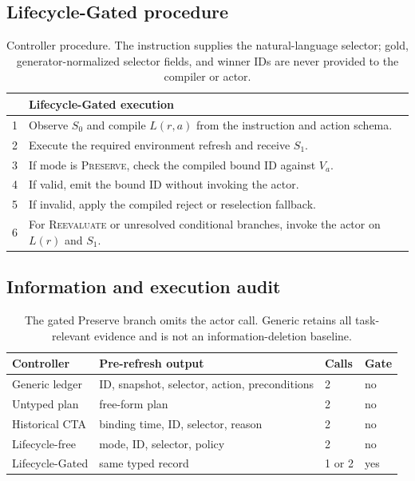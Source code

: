 \documentclass[10pt]{article}
\begin{document}
\subsection{Lifecycle-Gated procedure}
\begin{table}[H]
\centering
\small
\setlength{\tabcolsep}{4pt}
\begin{tabular}{rp{}}
\toprule
& Lifecycle-Gated execution \\
\midrule
1 & Observe $S_0$ and compile $L(r,a)$ from the instruction and action schema. \\
2 & Execute the required environment refresh and receive $S_1$. \\
3 & If mode is \textsc{Preserve}, check the compiled bound ID against $V_a$. \\
4 & If valid, emit the bound ID without invoking the actor. \\
5 & If invalid, apply the compiled reject or reselection fallback. \\
6 & For \textsc{Reevaluate} or unresolved conditional branches, invoke the actor on $L(r)$ and $S_1$. \\
\bottomrule
\end{tabular}
\caption{Controller procedure. The instruction supplies the natural-language selector; gold,
generator-normalized selector fields, and winner IDs are never provided to the compiler or actor.}
\label{tab:supp-procedure}
\end{table}

\subsection{Information and execution audit}
\begin{table}[h]
\centering
\small
\begin{tabular}{llll}
\toprule
Controller & Pre-refresh output & Calls & Gate\\
\midrule
Generic ledger & ID, snapshot, selector, action, preconditions & 2 & no\\
Untyped plan & free-form plan & 2 & no\\
Historical CTA & binding time, ID, selector, reason & 2 & no\\
Lifecycle-free & mode, ID, selector, policy & 2 & no\\
Lifecycle-Gated & same typed record & 1 or 2 & yes\\
\bottomrule
\end{tabular}
\caption{The gated Preserve branch omits the actor call. Generic retains all task-relevant
evidence and is not an information-deletion baseline.}
\end{table}
\end{document}
